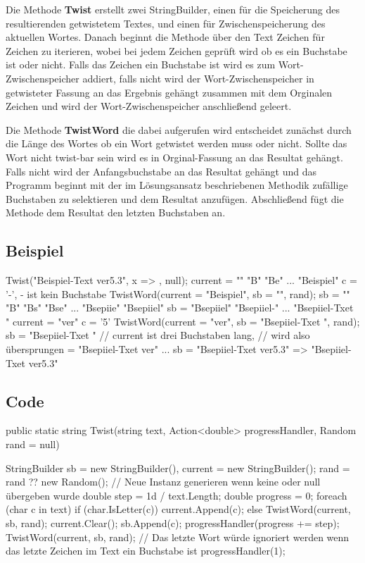 \documentclass{article}
\begin{document}
\begin{flushleft}
Die Methode \textbf{Twist} erstellt zwei StringBuilder, einen für die Speicherung des resultierenden getwistetem Textes, und einen für Zwischenspeicherung des aktuellen Wortes.
Danach beginnt die Methode über den Text Zeichen für Zeichen zu iterieren, wobei bei jedem Zeichen geprüft wird ob es ein Buchstabe ist oder nicht.
Falls das Zeichen ein Buchstabe ist wird es zum Wort-Zwischenspeicher addiert, falls nicht wird der Wort-Zwischenspeicher in getwisteter Fassung an das Ergebnis gehängt zusammen mit dem Orginalen Zeichen und wird der Wort-Zwischenspeicher anschließend geleert.

Die Methode \textbf{TwistWord} die dabei aufgerufen wird entscheidet zunächst durch die Länge des Wortes ob ein Wort getwistet werden muss oder nicht. Sollte das Wort nicht twist-bar sein wird es in Orginal-Fassung an das Resultat gehängt. Falls nicht wird der Anfangsbuchstabe an das Resultat gehängt und das Programm beginnt mit der im Lösungsansatz beschriebenen Methodik zufällige Buchstaben zu selektieren und dem Resultat anzufügen. Abschließend fügt die Methode dem Resultat den letzten Buchstaben an.

\newpage
\subsection{Beispiel}
\begin{Csharp}
Twist("Beispiel-Text ver5.3", x => {}, null);
{
  current = ""
            "B"
	  	    "Be"
		    ...
		    "Beispiel"
  c = '-', - ist kein Buchstabe
  TwistWord(current = "Beispiel", sb = "", rand);
  {
    sb = ""
         "B"
         "Bs"
         "Bse"
         ...
         "Bsepiie"
         "Bsepiiel"
  }
  sb = "Bsepiiel"
       "Bsepiiel-"
       ...
       "Bsepiiel-Txet "
  current = "ver"
  c = '5'
  TwistWord(current = "ver", sb = "Bsepiiel-Txet ", rand);
  {
    sb = "Bsepiiel-Txet "     // current ist drei Buchstaben lang,
                              // wird also übersprungen
       = "Bsepiiel-Txet ver"
  }
  ...
  sb = "Bsepiiel-Txet ver5.3"
}
=> "Bsepiiel-Txet ver5.3"
\end{Csharp}

\newpage
\subsection{Code}
\begin{Csharp}
public static string Twist(string text, Action<double> progressHandler, 
	Random rand = null)
{
    StringBuilder sb = new StringBuilder(), current = new StringBuilder();
    rand = rand ?? new Random();  
    	// Neue Instanz generieren wenn keine oder null übergeben wurde
    double step = 1d / text.Length;
    double progress = 0;
    foreach (char c in text)
    {
        if (char.IsLetter(c)) current.Append(c);
        else
        {
            TwistWord(current, sb, rand);
            current.Clear();
            sb.Append(c);
        }
        progressHandler(progress += step);
    }
    TwistWord(current, sb, rand); 
    	// Das letzte Wort würde ignoriert werden wenn das letzte Zeichen im Text ein Buchstabe ist
    progressHandler(1);

}
\end{Csharp}
\end{flushleft}
\end{document}
